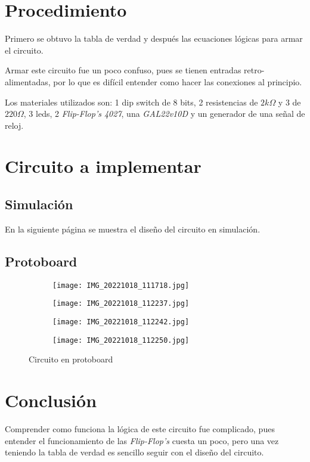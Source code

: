 \documentclass[12pt, oneside, openany]{article}
\begin{document}
\newpage
\section{Procedimiento}
{\sffamily\large
    \hspace{0.5cm} Primero se obtuvo la tabla de verdad y después las ecuaciones lógicas para armar el circuito.
    
    \hspace{0.5cm} Armar este circuito fue un poco confuso, pues se tienen entradas retro-alimentadas, por lo que es difícil entender como hacer las conexiones al principio.
    
    \hspace{0.5cm} Los materiales utilizados son: 1 dip switch de 8 bits, 2 resistencias de $2k\Omega$ y 3 de $220\Omega$, 3 leds, 2 \emph{Flip-Flop's 4027}, una \emph{GAL22v10D} y un generador de una señal de reloj.
    
}

\section{Circuito a implementar}
\subsection{Simulación}
{\sffamily\large
    \hspace{0.5cm} En la siguiente página se muestra el diseño del circuito en simulación.
    
    \newpage
    
}

\newpage
\subsection{Protoboard}
\begin{figure}[h!]
    \centering
    
    \begin{subfigure}[tl]{0.45\textwidth}
        \centering
        \texttt{[image: IMG\_20221018\_111718.jpg]}
    \end{subfigure}
    \begin{subfigure}[tr]{0.45\textwidth}
        \centering
        \texttt{[image: IMG\_20221018\_112237.jpg]}
    \end{subfigure}
    \begin{subfigure}[bl]{0.45\textwidth}
        \centering
        \texttt{[image: IMG\_20221018\_112242.jpg]}
    \end{subfigure}
    \begin{subfigure}[br]{0.45\linewidth}
        \centering
        \texttt{[image: IMG\_20221018\_112250.jpg]}
    \end{subfigure}
    
    \caption{\sffamily Circuito en protoboard}
    \label{fig:proto}
\end{figure}

\section{Conclusión}
{\sffamily\large
    \hspace{0.5cm} Comprender como funciona la lógica de este circuito fue complicado, pues entender el funcionamiento de las \emph{Flip-Flop's} cuesta un poco, pero una vez teniendo la tabla de verdad es sencillo seguir con el diseño del circuito.
    
}
\end{document}
